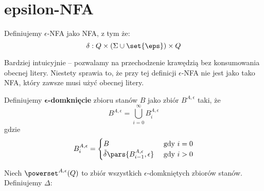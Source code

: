 \newpage
\section{epsilon-NFA}
\begin{definition}
	Definiujemy \( \epsilon \)-NFA jako NFA, z tym że:
	\[
		\delta: Q \times (\Sigma \cup \set{\eps}) \times Q
	\]
\end{definition}
Bardziej intuicyjnie -- pozwalamy na przechodzenie krawędzią bez konsumowania obecnej litery.
Niestety sprawia to, że przy tej definicji \( \epsilon \)-NFA nie jest jako tako NFA, który zawsze musi użyć obecnej litery.

\begin{definition}
	Definiujemy \(\mathbf{\epsilon}\)\textbf{-domknięcie} zbioru stanów \( B \) jako zbiór \( B^{A, \epsilon} \) taki, że
	\[
		B^{A, \epsilon} = \bigcup_{i=0}^\infty B_i^{A, \epsilon}
	\]
	gdzie
	\[
		B_i^{A, \epsilon} = \begin{cases}
			B                                                   & \text{ gdy } i = 0 \\
			\tilde \delta\pars{B_{i-1}^{A, \epsilon}, \epsilon} & \text{ gdy } i > 0
		\end{cases}
	\]
\end{definition}
\begin{definition}
	Niech \(\powerset^{A, \epsilon}(Q) \) to zbiór wszystkich \(\epsilon\)-domkniętych zbiorów stanów.
	Definiujemy \( \Delta :  \)
\end{definition}

